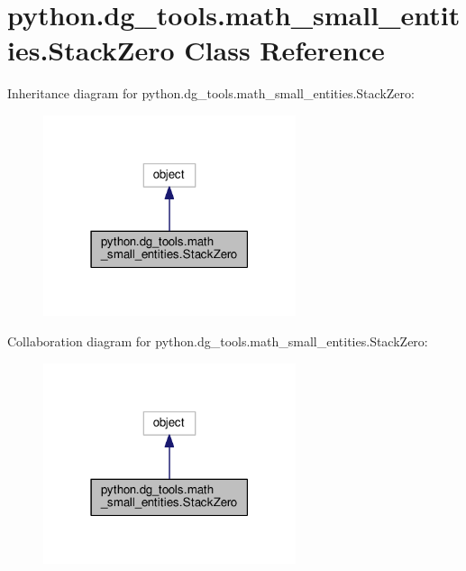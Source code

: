 \hypertarget{classpython_1_1dg__tools_1_1math__small__entities_1_1StackZero}{}\section{python.\+dg\+\_\+tools.\+math\+\_\+small\+\_\+entities.\+Stack\+Zero Class Reference}
\label{classpython_1_1dg__tools_1_1math__small__entities_1_1StackZero}


Inheritance diagram for python.\+dg\+\_\+tools.\+math\+\_\+small\+\_\+entities.\+Stack\+Zero\+:
\nopagebreak
\begin{figure}[H]
\begin{center}
\leavevmode
\includegraphics[width=210pt]{classpython_1_1dg__tools_1_1math__small__entities_1_1StackZero__inherit__graph}
\end{center}
\end{figure}


Collaboration diagram for python.\+dg\+\_\+tools.\+math\+\_\+small\+\_\+entities.\+Stack\+Zero\+:
\nopagebreak
\begin{figure}[H]
\begin{center}
\leavevmode
\includegraphics[width=210pt]{classpython_1_1dg__tools_1_1math__small__entities_1_1StackZero__coll__graph}
\end{center}
\end{figure}
